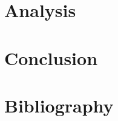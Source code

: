 \documentclass{article}
\begin{document}
\section{Analysis}\section{Conclusion}



\section*{Bibliography}
\end{document}
